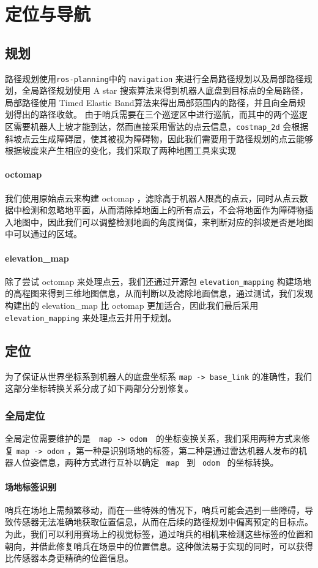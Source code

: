 \section{定位与导航}

\subsection{规划}
路径规划使用\lstinline{ros-planning}中的 \lstinline{navigation} 来进行全局路径规划以及局部路径规划，全局路径规划使用 A star 搜索算法来得到机器人底盘到目标点的全局路径，局部路径使用 Timed Elastic Band算法来得出局部范围内的路径，并且向全局规划得出的路径收敛。
由于哨兵需要在三个巡逻区中进行巡航，而其中的两个巡逻区需要机器人上坡才能到达，然而直接采用雷达的点云信息，\lstinline{costmap_2d} 会根据斜坡点云生成障碍层，使其被视为障碍物，因此我们需要用于路径规划的点云能够根据坡度来产生相应的变化，我们采取了两种地图工具来实现
\paragraph{octomap}
我们使用原始点云来构建 octomap ，滤除高于机器人限高的点云，同时从点云数据中检测和忽略地平面，从而清除掉地面上的所有点云，不会将地面作为障碍物插入地图中，因此我们可以调整检测地面的角度阀值，来判断对应的斜坡是否是地图中可以通过的区域。
\paragraph{elevation\_map}
除了尝试 octomap 来处理点云，我们还通过开源包 \lstinline{elevation_mapping} 构建场地的高程图来得到三维地图信息，从而判断以及滤除地面信息，通过测试，我们发现构建出的 elevation\_map 比 octomap 更加适合，因此我们最后采用 \lstinline{elevation_mapping} 来处理点云并用于规划。

\subsection{定位}
为了保证从世界坐标系到机器人的底盘坐标系 \lstinline{map -> base_link} 的准确性，我们这部分坐标转换关系分成了如下两部分分别修复。
\subsubsection{全局定位}
全局定位需要维护的是　\lstinline{map -> odom}　的坐标变换关系，我们采用两种方式来修复 \lstinline{map -> odom} ，第一种是识别场地的标签，第二种是通过雷达机器人发布的机器人位姿信息，两种方式进行互补以确定 \lstinline{ map } 到 \lstinline{ odom } 的坐标转换。
\paragraph{场地标签识别}
哨兵在场地上需频繁移动，而在一些特殊的情况下，哨兵可能会遇到一些障碍，导致传感器无法准确地获取位置信息，从而在后续的路径规划中偏离预定的目标点。为此，我们可以利用赛场上的视觉标签，通过哨兵的相机来检测这些标签的位置和朝向，并借此修复哨兵在场景中的位置信息。这种做法易于实现的同时，可以获得比传感器本身更精确的位置信息。


